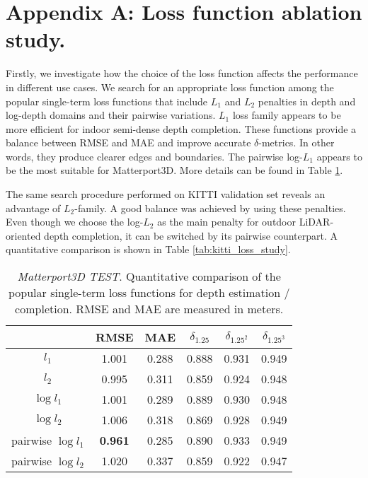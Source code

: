 \documentclass[final]{cvpr}
\begin{document}
{\small


}

\section*{Appendix A: Loss function ablation study.}

    Firstly, we investigate how the choice of the loss function affects the performance in different use cases. We search for an appropriate loss function among the popular single-term loss functions that include $L_1$ and $L_2$ penalties in depth and log-depth domains and their pairwise variations. $L_1$ loss family appears to be more efficient for indoor semi-dense depth completion. These functions provide a balance between RMSE and MAE and improve accurate $\delta$-metrics. In other words, they produce clearer edges and boundaries. The pairwise log-$L_1$ appears to be the most suitable for Matterport3D. More details can be found in Table \ref{tab:mp3d_loss_study}.
    
    The same search procedure performed on KITTI validation set reveals an advantage of $L_2$-family. A good balance was achieved by using these penalties. Even though we choose the log-$L_2$ as the main penalty for outdoor LiDAR-oriented depth completion, it can be switched by its pairwise counterpart. A quantitative comparison is shown in Table \ref{tab:kitti_loss_study}.
    
    
    \begin{table}[ht]
    \setlength{\tabcolsep}{5pt}
    \renewcommand{\arraystretch}{1.1}
    \centering
    	\begin{tabular}{ c|c|c|c|c|c} 
& RMSE & MAE & $\delta_{1.25}$ & $\delta_{1.25^2}$ & $\delta_{1.25^3}$\\
    		\hline
    		\hline
    		$l_1$ & 1.001 & 0.288 & 0.888 & 0.931 & 0.949  \\
    		$l_2$ & 0.995 & 0.311 & 0.859 & 0.924 & 0.948 \\
    		$\log l_1$ & 1.001 & 0.289 & 0.889 & 0.930 & 0.948 \\
    		$\log l_2$ & 1.006 & 0.318 & 0.869 & 0.928 & 0.949 \\
    		pairwise $\log l_1$& \textbf{0.961} & 0.285 & 0.890 & 0.933 & 0.949 \\
    		pairwise $\log l_2$& 1.020 & 0.337 & 0.859 & 0.922 & 0.947 \\
    		\hline
    
    	\end{tabular}
    	\vspace{0.1cm}
    	\caption{\emph{Matterport3D TEST}. Quantitative comparison of the popular single-term loss functions for depth estimation / completion. RMSE and MAE are measured in meters.}
    	\label{tab:mp3d_loss_study}
    \end{table}
    
\end{document}
